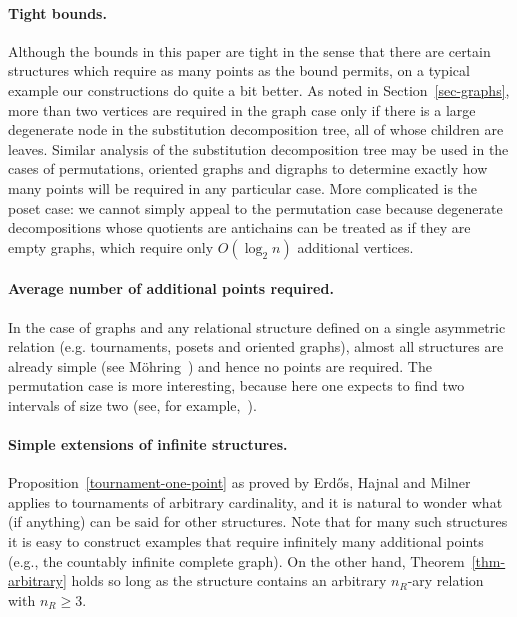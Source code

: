 \documentclass[11pt]{article}
\begin{document}
\paragraph{Tight bounds.} Although the bounds in this paper are tight in the sense that there are certain structures which require as many points as the bound permits, on a typical example our constructions do quite a bit better. As noted in Section~\ref{sec-graphs}, more than two vertices are required in the graph case only if there is a large degenerate node in the substitution decomposition tree, all of whose children are leaves. Similar analysis of the substitution decomposition tree may be used in the cases of permutations, oriented graphs and digraphs to determine exactly how many points will be required in any particular case. More complicated is the poset case: we cannot simply appeal to the permutation case because degenerate decompositions whose quotients are antichains can be treated as if they are empty graphs, which require only $O(\log_2 n)$ additional vertices.

\paragraph{Average number of additional points required.} In the case of graphs and any relational structure defined on a single asymmetric relation (e.g. tournaments, posets and oriented graphs), almost all structures are already simple (see M\"ohring~\cite{mohring:on-the-distribu:}) and hence no points are required. The permutation case is more interesting, because here one expects to find two intervals of size two (see, for example,~\cite{brignall:a-survey-of-sim:}).

\paragraph{Simple extensions of infinite structures.} Proposition~\ref{tournament-one-point} as proved by Erd{\H{o}}s, Hajnal and Milner applies to tournaments of arbitrary cardinality, and it is natural to wonder what (if anything) can be said for other structures. Note that for many such structures it is easy to construct examples that require infinitely many additional points (e.g., the countably infinite complete graph). On the other hand, Theorem~\ref{thm-arbitrary} holds so long as the structure contains an arbitrary $n_R$-ary relation with $n_R\geq 3$.



\end{document}
